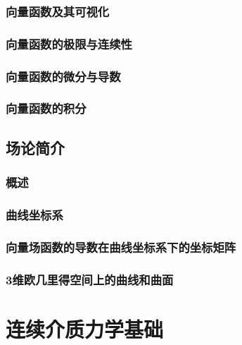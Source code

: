 \documentclass[
  zihao=5,
  a4paper,
  heading=true,
  twoside
]{ctexbook}
\theoremstyle{definition}
\theoremstyle{plain}
\begin{document}
\section{向量函数及其可视化}\label{sec:II.4.1}


\section{向量函数的极限与连续性}\label{sec:II.4.2}


\section{向量函数的微分与导数}\label{sec:II.4.3}


\section{向量函数的积分}\label{sec:II.4.4}


\chapter{场论简介}\label{sec:II.5}
\section{概述}\label{sec:II.5.1}


\section{曲线坐标系}\label{sec:II.5.2}


\section{向量场函数的导数在曲线坐标系下的坐标矩阵}\label{sec:II.5.3}


\section{3维欧几里得空间上的曲线和曲面}\label{sec:II.5.4}


\part{连续介质力学基础}\label{sec:III}
\end{document}
